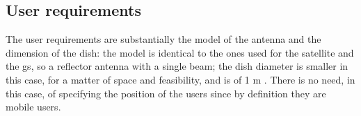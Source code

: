 \subsection{User requirements}
The user requirements are substantially the model of the antenna and the dimension of the dish: the model is identical to the ones used for the satellite and the \gls{gs}, so a reflector antenna with a single beam; the dish diameter is smaller in this case, for a matter of space and feasibility, and is of 1 m . There is no need, in this case, of specifying the position of the users since by definition they are mobile users.
